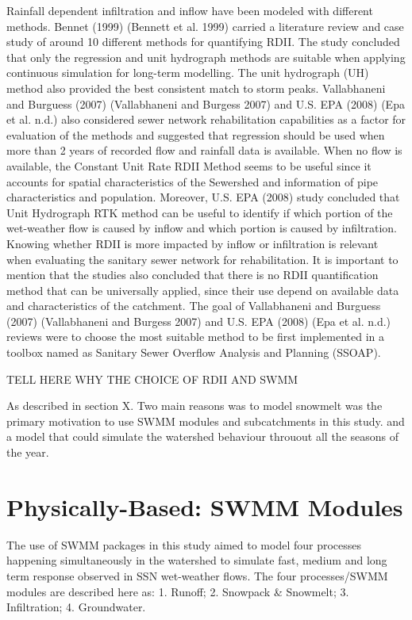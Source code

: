 Rainfall dependent infiltration and inflow have been modeled with different methods. Bennet (1999) (Bennett et al. 1999) carried a literature review and case study of around 10 different methods for quantifying RDII. 
The study concluded that only the regression and unit hydrograph methods are suitable when applying continuous simulation for long-term modelling. The unit hydrograph (UH) method also provided the best consistent match to storm peaks. Vallabhaneni and Burguess (2007) (Vallabhaneni and Burgess 2007) and U.S. EPA (2008) (Epa et al. n.d.) also considered sewer network rehabilitation capabilities as a factor for evaluation of the methods and suggested that regression should be used when more than 2 years of recorded flow and rainfall data is available. When no flow is available, the Constant Unit Rate RDII Method seems to be useful since it accounts for spatial characteristics of the Sewershed and information of pipe characteristics and population. Moreover, U.S. EPA (2008) study concluded that Unit Hydrograph RTK method can be useful to identify if which portion of the wet-weather flow is caused by inflow and which portion is caused by infiltration. Knowing whether RDII is more impacted by inflow or infiltration is relevant when evaluating the sanitary sewer network for rehabilitation. 
It is important to mention that the studies also concluded that there is no RDII quantification method that can be universally applied, since their use depend on available data and characteristics of the catchment. The goal of Vallabhaneni and Burguess (2007) (Vallabhaneni and Burgess 2007) and U.S. EPA (2008) (Epa et al. n.d.) reviews were to choose the most suitable method to be first implemented in a toolbox named as Sanitary Sewer Overflow Analysis and Planning (SSOAP). 




TELL HERE WHY THE CHOICE OF RDII AND SWMM

As described in section X. Two main reasons was to model snowmelt was the primary motivation to use SWMM modules and subcatchments in this study. and a model that could simulate the watershed behaviour throuout all the seasons of the year. 

\section{Physically-Based: SWMM Modules}

The use of SWMM packages in this study aimed to model four processes happening simultaneously in the watershed to simulate fast, medium and long term response observed in \ac{SSN} wet-weather flows. The four processes/SWMM modules are described here as: 1. Runoff; 2. Snowpack \& Snowmelt; 3. Infiltration; 4. Groundwater. 


